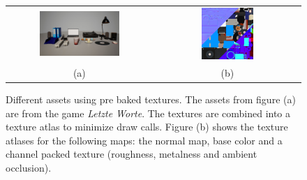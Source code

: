 \begin{figure}
	\centering\small 
	\begin{tabular}{@{}cc@{}}
		\includegraphics[width=0.575\textwidth]{images/07cha_04_pattern_LeaAssets.jpg} &
		\includegraphics[width=0.375\textwidth]{images/07cha_04_textureAltas.jpg} \\	
		(a) & (b) \\
	\end{tabular}
	\label{fig:leaProps}
	\caption{Different assets using pre baked textures. The assets from figure (a) are from the game \emph{Letzte Worte}. The textures are combined into a texture atlas to minimize draw calls. Figure (b) shows the texture atlases for the following maps: the normal map, base color and a channel packed texture (roughness, metalness and ambient occlusion). }
\end{figure}


